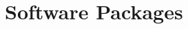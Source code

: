 \documentclass[a4paper]{ustthesis}
\begin{document}
\chapter{Software Packages}
\label{chp_appendix_softwares}


\end{document}
